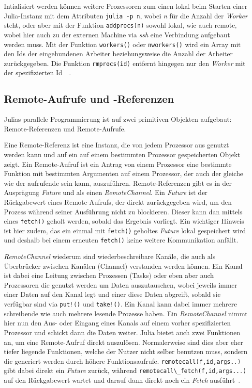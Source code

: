 \documentclass[proseminar,german,utf8]{zihpub}
\begin{document}
Intialisiert werden können weitere Prozessoren zum einen lokal beim Starten einer Julia-Instanz mit dem Attributen \verb|julia -p n|, wobei \textit{n} für die Anzahl der \textit{Worker} steht, oder aber mit der Funktion \verb|addprocs(n)| sowohl lokal, wie auch remote, wobei hier auch zu der externen Machine via \textit{ssh} eine Verbindung aufgebaut werden muss. Mit der Funktion \verb|workers()| oder \verb|nworkers()| wird ein Array mit den Ids der eingebundenen Arbeiter beziehungsweise die Anzahl der Arbeiter zurückgegeben. Die Funktion \verb|rmprocs(id)| entfernt hingegen nur den \textit{Worker} mit der spezifizierten Id~\cite{JuliaLangDocumentation}~\cite{JuliaCookbook}.

\subsection{Remote-Aufrufe und -Referenzen}

Julias parallele Programmierung ist auf zwei primitiven Objekten aufgebaut: Remote-Referenzen und Remote-Aufrufe. 

Eine Remote-Referenz ist eine Instanz, die von jedem Prozessor aus genutzt werden kann und auf ein auf einem bestimmten Prozessor gespeicherten Objekt zeigt. Ein Remote-Aufruf ist ein Antrag von einem Prozessor eine bestimmte Funktion mit bestimmten Argumenten auf einem Prozessor, der auch der gleiche wie der aufrufende sein kann, auszuführen. Remote-Referenzen gibt es in der Ausprägung \textit{Future} und als einen \textit{RemoteChannel}. Ein \textit{Future} ist der Rückgabewert eines Remote-Aufrufs, der direkt zurückgegeben wird, um den Prozess während seiner Ausführung nicht zu blockieren. Dieser kann dan mittels eines \verb|fetch()| geholt werden, sobald das Ergebnis vorliegt. Ein wichtiger Hinweis ist hier zudem, das ein einmal mit \verb|fetch()| geholtes \textit{Future} lokal gespeichert wird und deshalb bei einem erneuten \verb|fetch()| keine weitere Kommunikation anfällt. 

\textit{RemoteChannel} wiederum sind wiederbeschreibare Kanäle, die auch als Überbrücker zwischen Kanälen (Channel) verstanden werden können. Ein Kanal ist dabei eine Leitung zwischen Prozessen (Tasks) oder eben aber auch Prozessoren die genutzt werden um Daten auszutauschen, wobei jeweils immer einer Daten auf den Kanal legt und einer diese Daten abgreift, sobald sie verfügbar sind via \verb|put!()| und \verb|take!()|. Ein Kanal kann dabei immer mehrere schreibende wie auch mehrere lesende Prozesse haben. Ein \textit{RemoteChannel} nimmt hier nun den Aus- oder Eingang eines Kanals auf einem vorher spezifizierten Prozessor und schickt dann die Daten weiter. Julia bietet auch zwei Funktionen an, um eine Remote-Aufruf direkt auszulösen. Normalerweise sind dies aber eher tiefer liegende Funktionen, welche der Nutzer nicht selber benutzen muss, sondern die generiert werden durch höhere Funktionsaufrufe. \verb|remotecall(f,id,args..)| gibt dabei direkt ein \textit{Future} zurück, während \verb|remotecall\_fetch(f,id,args...)| auf den Rückgabewert wartet und darauf dann direkt noch ein \textit{Fetch} ausführt~\cite{JuliaLangDocumentation}.
\end{document}
